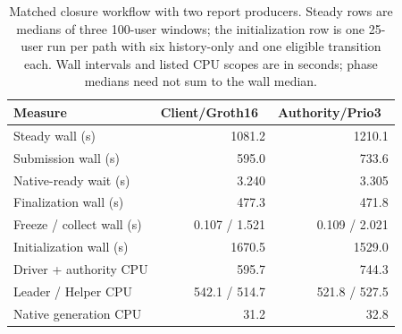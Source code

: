\begin{table}[t]
\centering
\caption{Matched closure workflow with two report producers. Steady rows are medians of three
100-user windows; the initialization row is one 25-user run per path with
six history-only and one eligible transition each. Wall intervals and listed
CPU scopes are in seconds; phase medians need not sum to the wall median.}
\label{tab:authority-generated-cost}
\footnotesize
\setlength{\tabcolsep}{3pt}
\begin{tabularx}{\columnwidth}{@{}Yrr@{}}
\toprule
Measure & Client/Groth16~\cite{Groth2016pairing} & Authority/Prio3~\cite{Barnes2023VDAF08} \\
\midrule
Steady wall (s) & 1081.2 & 1210.1 \\
Submission wall (s) & 595.0 & 733.6 \\
Native-ready wait (s) & 3.240 & 3.305 \\
Finalization wall (s) & 477.3 & 471.8 \\
Freeze / collect wall (s) & 0.107 / 1.521 & 0.109 / 2.021 \\
Initialization wall (s) & 1670.5 & 1529.0 \\
Driver + authority CPU & 595.7 & 744.3 \\
Leader / Helper CPU & 542.1 / 514.7 & 521.8 / 527.5 \\
Native generation CPU & 31.2 & 32.8 \\
\bottomrule
\end{tabularx}
\end{table}
